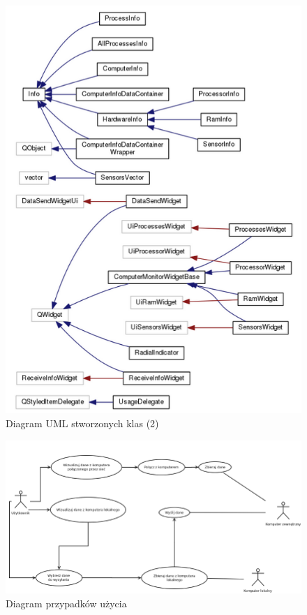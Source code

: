 \documentclass[a4paper]{article}
\begin{document}
\begin{figure}[H]
	\centering
	\includegraphics[width=\linewidth]{img/diagramKlas2.png}
	\caption{Diagram UML stworzonych klas (2)}
	\label{diagram_klas_2}
\end{figure}

\begin{figure}[H]
	\centering
	\includegraphics[width=0.75\paperheight, angle=90]{img/diagramPrzypadkowUzycia.png}
	\caption{Diagram przypadków użycia}
	\label{diagram_przypadkow_uzycia}
\end{figure}
\end{document}
